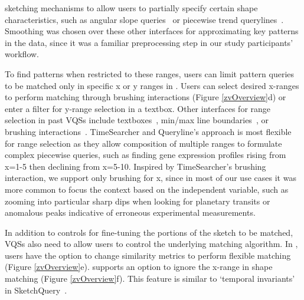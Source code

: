 sketching mechanisms to allow users to partially specify certain shape characteristics, such as angular slope queries~\cite{Hochheiser2004} or piecewise trend querylines~\cite{ryall2005querylines}. Smoothing was chosen over these other interfaces for approximating key patterns in the data, since it was a familiar preprocessing step in our study participants' workflow.
\item To find patterns when restricted to these ranges, users can limit pattern queries to be matched only in specific x or y ranges in \zvpp. Users can select desired x-ranges to perform matching through brushing interactions (Figure \ref{zvOverview}d) or enter a filter for y-range selection in a textbox. Other interfaces for range selection in past VQSs
include textboxes~\cite{wattenberg2001sketching,Mannino2018}, min/max line boundaries~\cite{ryall2005querylines},
or brushing interactions~\cite{Hochheiser2001}. TimeSearcher and Queryline's approach is most flexible for range selection as
they allow composition of multiple ranges to formulate complex piecewise queries, such as finding gene expression profiles
rising from x=1-5 then declining from x=5-10. Inspired by TimeSearcher's brushing interaction, we support only brushing for x, since in most of our use cases it was more common to focus the context based on the independent variable, such as zooming into particular sharp dips when looking for planetary transits or anomalous peaks indicative of erroneous experimental measurements.
\item  In addition to controls for fine-tuning the portions of the sketch to be matched, VQSs also need to allow users to control the underlying matching algorithm. In \zvpp, users have the option to change similarity metrics to perform flexible matching (Figure \ref{zvOverview}e). \zvpp supports an option to ignore the x-range in shape matching (Figure \ref{zvOverview}f). This feature is similar to `temporal invariants' in SketchQuery~\cite{correll2016semantics}.
\enumend
